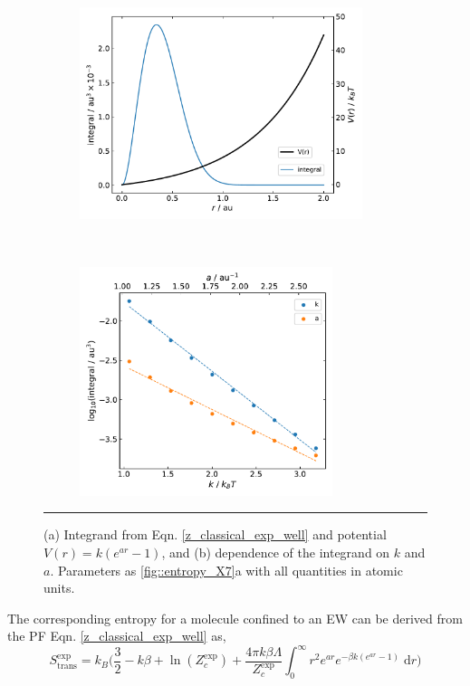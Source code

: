 \documentclass[../main.tex]{subfiles}
\begin{document}
\vspace{0.2cm}
\begin{figure}[h!]
	\begin{subfigure}[t]{0.5\textwidth}
		\centering
		\includegraphics[height=6.2cm]{4/figs/figX8/classical_integrand.pdf}
		\caption{}
	\end{subfigure}%
	~ 
	\begin{subfigure}[t]{0.5\textwidth}
		\centering
		\includegraphics[height=6.7cm]{4/figs/figX8/integrand_a_k.pdf}
		\caption{}
	\end{subfigure}
	\vspace{0.2cm}
	\hrule
	\caption{(a) Integrand from Eqn. \eqref{z_classical_exp_well} and potential $V(r) = k(e^{ar} - 1)$, and (b) dependence of the integrand on $k$ and $a$. Parameters as \figurename{ \ref{fig::entropy_X7}a} with all quantities in atomic units.} 
	\label{fig::entropy_X8}
\end{figure}

The corresponding entropy for a molecule confined to an EW can be derived from the PF Eqn. \eqref{z_classical_exp_well} as,
\begin{equation}
S_\text{trans}^\text{exp}= k_B {\Big (} \frac{3}{2} - {k}{\beta} + \ln(Z_c^\text{exp}) + \frac{4\pi k\beta\Lambda}{Z_c^\text{exp}} \int_{0}^{\infty} r^2 e^{ar} e^{-\beta k (e^{ar} - 1)} \; \text{d}r  {\Big )} 
\label{s_ew}
\end{equation}
\end{document}
